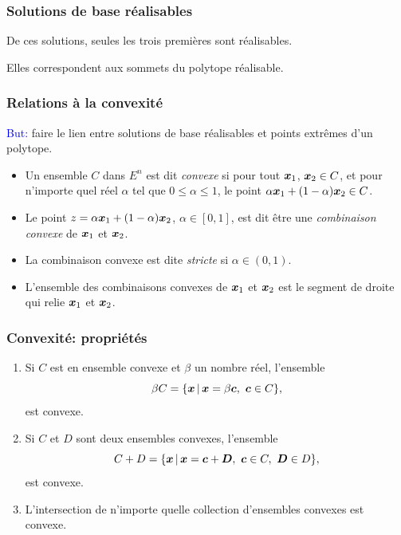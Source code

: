 \documentclass[usepdftitle=false]{beamer}
\begin{document}
\begin{frame}
\frametitle{Solutions de base réalisables}

De ces solutions, seules les trois premières sont réalisables.

\mbox{}

Elles correspondent aux sommets du polytope réalisable.

\end{frame}

\begin{frame}
\frametitle{Relations à la convexité}

\textcolor{blue}{But:} faire le lien entre solutions de base réalisables et points extrêmes d'un polytope.

\begin{itemize}
	\item
	Un ensemble $C$ dans $E^n$ est dit {\it convexe} si pour tout ${\boldsymbol{x}}_1$, ${\boldsymbol{x}}_2 \in C$, et pour n'importe quel réel $\alpha$ tel que $0 \leq \alpha \leq 1$, le point $\alpha {\boldsymbol{x}}_1 + (1-\alpha) {\boldsymbol{x}}_2 \in C$.
	\item
Le point $z = \alpha {\boldsymbol{x}}_1 + (1-\alpha) {\boldsymbol{x}}_2$, $\alpha \in [0, 1]$, est dit être une {\it combinaison convexe} de ${\boldsymbol{x}}_1$ et ${\boldsymbol{x}}_2$.
	\item
La combinaison convexe est dite {\it stricte} si $\alpha \in (0, 1)$.
	\item
L'ensemble des combinaisons convexes de ${\boldsymbol{x}}_1$ et ${\boldsymbol{x}}_2$ est le segment de droite qui relie ${\boldsymbol{x}}_1$ et ${\boldsymbol{x}}_2$.
\end{itemize}

\end{frame}

\begin{frame}
\frametitle{Convexité: propriétés}

\begin{enumerate}
	\item
	Si $C$ est en ensemble convexe et $\beta$ un nombre réel, l'ensemble
	\[
	\beta C = \lbrace {\boldsymbol{x}} \,|\, {\boldsymbol{x}} = \beta {\boldsymbol{c}},\ {\boldsymbol{c}} \in C \rbrace,
	\]
	est convexe.
	\item
	Si $C$ et $D$ sont deux ensembles convexes, l'ensemble
	\[
	C + D = \lbrace {\boldsymbol{x}} \,|\, {\boldsymbol{x}} = {\boldsymbol{c}} + {\boldsymbol{D}},\ {\boldsymbol{c}} \in C,\ {\boldsymbol{D}} \in D \rbrace,
	\]
	est convexe.
	\item
	L'intersection de n'importe quelle collection d'ensembles convexes est convexe.
\end{enumerate}

\end{frame}
\end{document}
